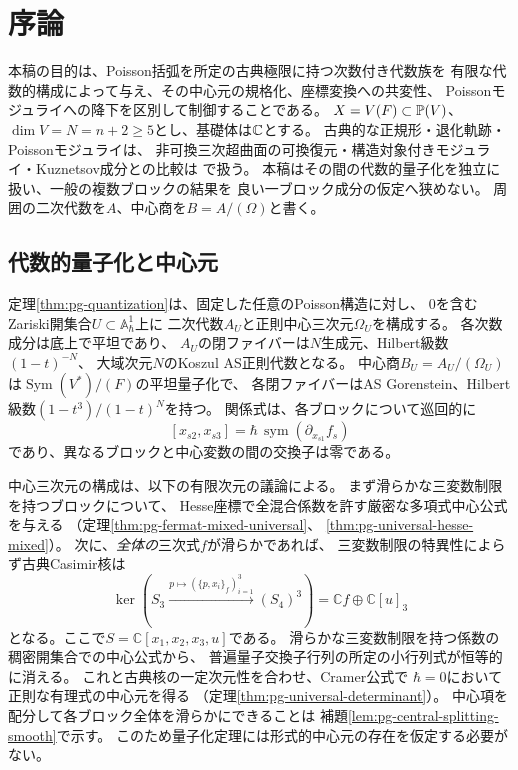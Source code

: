 \section{序論}\label{sec:cq-introduction}
本稿の目的は、Poisson括弧を所定の古典極限に持つ次数付き代数族を
有限な代数的構成によって与え、その中心元の規格化、座標変換への共変性、
Poissonモジュライへの降下を区別して制御することである。
$X=V(F)\subset\mathbb P(V)$、$\dim V=N=n+2\ge5$とし、基礎体は$\mathbb C$とする。
古典的な正規形・退化軌跡・Poissonモジュライは\cite{PoissonCubic}、
非可換三次超曲面の可換復元・構造対象付きモジュライ・Kuznetsov成分との比較は
\cite{NCCubicMain}で扱う。
本稿はその間の代数的量子化を独立に扱い、一般の複数ブロックの結果を
良い一ブロック成分の仮定へ狭めない。
周囲の二次代数を$A$、中心商を$B=A/(\Omega)$と書く。

\subsection*{代数的量子化と中心元}
定理\ref{thm:pg-quantization}は、固定した任意のPoisson構造に対し、
$0$を含むZariski開集合$U\subset\mathbb A^1_\hbar$上に
二次代数$A_U$と正則中心三次元$\Omega_U$を構成する。
各次数成分は底上で平坦であり、
$A_U$の閉ファイバーは$N$生成元、Hilbert級数$(1-t)^{-N}$、
大域次元$N$のKoszul AS正則代数となる。
中心商$B_U=A_U/(\Omega_U)$は$\operatorname{Sym}(V^*)/(F)$の平坦量子化で、
各閉ファイバーはAS Gorenstein、Hilbert級数$(1-t^3)/(1-t)^N$を持つ。
関係式は、各ブロックについて巡回的に
\begin{equation}\label{eq:intro-quantum-relations}
 [x_{s2},x_{s3}]
 =\hbar\,\operatorname{sym}(\partial_{x_{s1}}f_s)
\end{equation}
であり、異なるブロックと中心変数の間の交換子は零である。

中心三次元の構成は、以下の有限次元の議論による。
まず滑らかな三変数制限を持つブロックについて、
Hesse座標で全混合係数を許す厳密な多項式中心公式を与える
（定理\ref{thm:pg-fermat-mixed-universal}、
\ref{thm:pg-universal-hesse-mixed}）。
次に、\emph{全体の}三次式$f$が滑らかであれば、
三変数制限の特異性によらず古典Casimir核は
\begin{equation}\label{eq:intro-classical-kernel-all}
 \ker\left(S_3\xrightarrow{p\mapsto(\{p,x_i\}_f)_{i=1}^3}
 (S_4)^3\right)=\mathbb C f\oplus\mathbb C[u]_3
\end{equation}
となる。ここで$S=\mathbb C[x_1,x_2,x_3,u]$である。
滑らかな三変数制限を持つ係数の稠密開集合での中心公式から、
普遍量子交換子行列の所定の小行列式が恒等的に消える。
これと古典核の一定次元性を合わせ、Cramer公式で
$\hbar=0$において正則な有理式の中心元を得る
（定理\ref{thm:pg-universal-determinant}）。
中心項を配分して各ブロック全体を滑らかにできることは
補題\ref{lem:pg-central-splitting-smooth}で示す。
このため量子化定理には形式的中心元の存在を仮定する必要がない。

